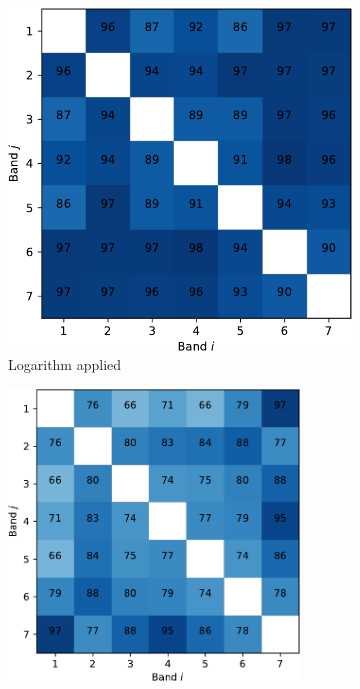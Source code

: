 \documentclass{article}
\begin{document}
\begin{figure}[h] 
  \begin{subfigure}[b]{0.49\linewidth}
    \centering
    \includegraphics[width=0.85\linewidth]{sup-crop.pdf} 
    \caption{Logarithm applied} 
    \label{fig7:a} 
  \end{subfigure}%
  \begin{subfigure}[b]{0.49\linewidth}
    \centering
    \includegraphics[width=0.85\textwidth]{un-crop.pdf} 

\end{subfigure}
\end{figure}
\end{document}
